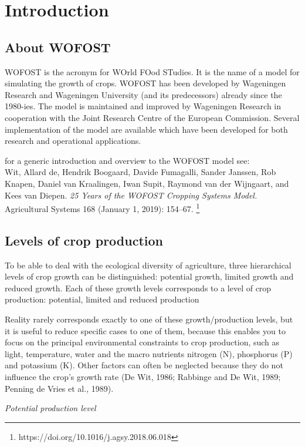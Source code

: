 
\chapter{Introduction} 

\section{About WOFOST}

WOFOST is the acronym for WOrld FOod STudies. It is the name of a model for
simulating the growth of crops. WOFOST has been developed by
Wageningen Research and Wageningen University (and its predecessors) already
since the 1980-ies. The model is maintained and improved by Wageningen 
Research in cooperation with the Joint Research Centre of the European 
Commission. Several implementation of the model are available which have been
developed for both research and operational applications.

for a generic introduction and overview to the WOFOST model see:\\
Wit, Allard de, Hendrik Boogaard, Davide Fumagalli, Sander Janssen, Rob Knapen, 
Daniel van Kraalingen, Iwan Supit, Raymond van der Wijngaart, and Kees van Diepen. 
\textit{25 Years of the WOFOST Cropping Systems Model.} Agricultural Systems 168 
(January 1, 2019): 154–67. \footnote{https://doi.org/10.1016/j.agsy.2018.06.018}


\section{Levels of crop production}

To be able to deal with the ecological diversity of agriculture, three hierarchical levels of 
crop growth can be distinguished: potential growth, limited growth and reduced growth. 
Each of these growth levels corresponds to a level of crop production: potential, limited and 
reduced production

Reality rarely corresponds exactly to one of these growth/production levels, but it is 
useful to reduce specific cases to one of them, because this enables you to focus on the 
principal environmental constraints to crop production, such as light, temperature, 
water and the macro nutrients nitrogen (N), phosphorus (P) and potassium (K). Other 
factors can often be neglected because they do not influence the crop's growth rate 
(De Wit, 1986; Rabbinge and De Wit, 1989; Penning de Vries et al., 1989).

{\it Potential production level\/}\\

